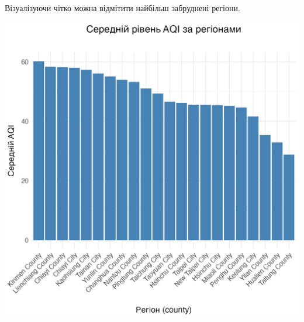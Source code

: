 \documentclass{article}
\begin{document}
\begin{enumerate}
    Візуалізуючи чітко можна відмітити найбільш забруднені регіони.
    \begin{center}
    \includegraphics[width=6in]{plots/question4/avg_aqi_by_county.png}
    \end{center}


\end{enumerate}
\end{document}
